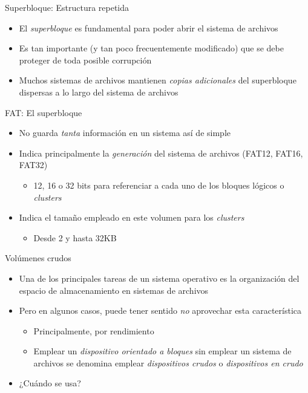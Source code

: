 \documentclass[presentation]{beamer}
\begin{document}
\begin{frame}[label={sec:org278aafa}]{Superbloque: Estructura repetida}
\begin{itemize}
\item El \emph{superbloque} es fundamental para poder abrir el sistema de
archivos
\item Es tan importante (y tan poco frecuentemente modificado) que se
debe proteger de toda posible corrupción
\item Muchos sistemas de archivos mantienen \emph{copias adicionales} del
superbloque dispersas a lo largo del sistema de archivos
\end{itemize}
\end{frame}

\begin{frame}[label={sec:orgac6277b}]{FAT: El superbloque}
\begin{itemize}
\item No guarda \emph{tanta} información en un sistema así de simple
\item Indica principalmente la \emph{generación} del sistema de archivos
(FAT12, FAT16, FAT32)
\begin{itemize}
\item 12, 16 o 32 bits para referenciar a cada uno de los bloques
lógicos o \emph{clusters}
\end{itemize}
\item Indica el tamaño empleado en este volumen para los \emph{clusters}
\begin{itemize}
\item Desde 2 y hasta 32KB
\end{itemize}
\end{itemize}
\end{frame}

\begin{frame}[label={sec:org4d1b9b5}]{Volúmenes crudos}
\begin{itemize}
\item Una de los principales tareas de un sistema operativo es
la organización del espacio de almacenamiento en sistemas de
archivos
\item Pero en algunos casos, puede tener sentido \emph{no} aprovechar esta
característica
\begin{itemize}
\item Principalmente, por rendimiento
\item Emplear un \emph{dispositivo orientado a bloques} sin emplear un
sistema de archivos se denomina emplear \emph{dispositivos crudos} o
\emph{dispositivos en crudo}
\end{itemize}
\item ¿Cuándo se usa?
\end{itemize}
\end{frame}
\end{document}
